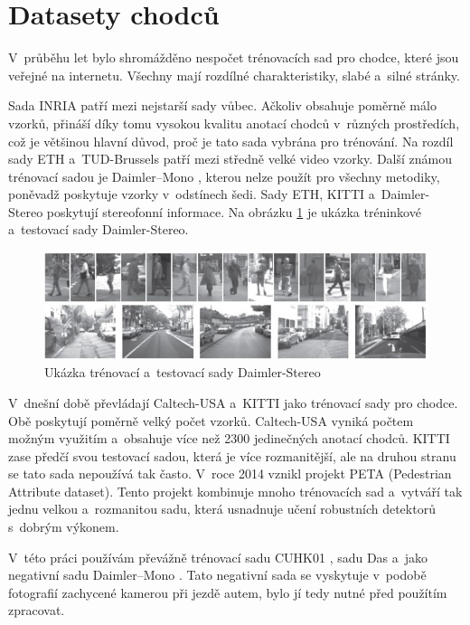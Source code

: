 \section{Datasety chodců} 
V~průběhu let bylo shromážděno nespočet trénovacích sad pro chodce, které jsou veřejné na internetu. Všechny mají rozdílné charakteristiky, slabé a~silné stránky. 

Sada INRIA \cite{inria} patří mezi nejstarší sady vůbec. Ačkoliv obsahuje poměrně málo vzorků, přináší díky tomu vysokou kvalitu anotací chodců v~různých prostředích, což je většinou hlavní důvod, proč je tato sada vybrána pro trénování. Na rozdíl sady ETH \cite{eth} a~TUD-Brussels \cite{tudbrussels} patří mezi středně velké video vzorky. Další známou trénovací sadou je Daimler--Mono \cite{daimler}, kterou nelze použít pro všechny metodiky, poněvadž poskytuje vzorky v~odstínech šedi. Sady ETH, KITTI \cite{kitti} a~Daimler-Stereo \cite{daimlerstereo} poskytují stereofonní informace. Na obrázku \ref{fig:daimler_stereo} je ukázka tréninkové a~testovací sady Daimler-Stereo. 

\begin{figure}[H]
\centering
\includegraphics[width=16cm]{figures/daimler_stereo}
\caption{Ukázka trénovací a~testovací sady Daimler-Stereo \cite{daimlerstereo}}
\label{fig:daimler_stereo}
\end{figure}

V~dnešní době převládají Caltech-USA \cite{caltech} a~KITTI jako trénovací sady pro chodce. Obě poskytují poměrně velký počet vzorků. Caltech-USA vyniká počtem možným využitím a~obsahuje více než 2300 jedinečných anotací chodců. KITTI zase předčí svou testovací sadou, která je více rozmanitější, ale na druhou stranu se tato sada nepoužívá tak často. V~roce 2014 vznikl projekt PETA (Pedestrian Attribute dataset)\cite{peta}. Tento projekt kombinuje mnoho trénovacích sad a~vytváří tak jednu velkou a~rozmanitou sadu, která usnadnuje učení robustních detektorů s~dobrým výkonem.

V~této práci používám převážně trénovací sadu CUHK01 \cite{cuhk}, sadu Das \cite{sudipdas} a~jako negativní sadu Daimler--Mono \cite{daimler}. Tato negativní sada se vyskytuje v~podobě fotografií zachycené kamerou při jezdě autem, bylo jí tedy nutné před použítím zpracovat. 

